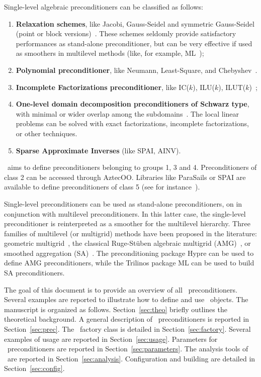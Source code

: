 Single-level algebraic preconditioners can be classified as follows:
\begin{enumerate}
\item {\bf Relaxation schemes},
  like Jacobi, Gauss-Seidel and symmetric Gauss-Seidel (point or block versions)~\cite{varga00matrix}.
  These schemes seldomly provide satisfactory performances as stand-alone
  preconditioner, but can be very effective if used as smoothers in
  multilevel methods (like, for example, ML~\cite{ml-guide});
\item {\bf Polynomial preconditioner}, like Neumann, Least-Square, and
Chebyshev~\cite{saad96iterative}.
\item {\bf Incomplete Factorizations preconditioner}, like IC($k$), ILU($k$), 
  ILUT($k$)~\cite{saad96iterative};
\item {\bf One-level domain decomposition preconditioners of Schwarz type},
  with minimal or wider overlap among the subdomains~\cite{smith96parallel,
    QV2}. The local linear problems
  can be solved with exact factorizations, incomplete factorizations, or
  other techniques.
\item {\bf Sparse Approximate Inverses} (like SPAI, AINV).
\end{enumerate}
\ifpack\ aims to define preconditioners belonging to groups 1, 3 and 4.
Preconditioners of class 2 can be accessed through AztecOO. Libraries like
ParaSails or SPAI are available to define preconditioners of class 5 
(see for instance~\cite{grote97parallel,benzi98sparse}).

\begin{remark}
Single-level preconditioners can be used as stand-alone preconditioners, on in
conjunction with multilevel preconditioners. In this latter case, the
single-level preconditioner is reinterpreted as a smoother for the multilevel
hierarchy. Three families of multilevel (or multigrid) methods have been
proposed in the literature: geometric multigrid~\cite{brandt.classic},
the classical Ruge-St\"uben algebraic multigrid (AMG)~\cite{ruge87algebraic}, 
  or smoothed aggregation (SA)~\cite{vanek4}.
The preconditioning package Hypre can be used to define AMG preconditioners,
  while the Trilinos package ML can be used to build SA preconditioners.
\end{remark}

\smallskip

The goal of this document is to provide an overview of all \ifpack\
  preconditioners. Several examples are reported to illustrate how to define
  and use \ifpack\ objects. The manuscript is organized as follows. Section~\ref{sec:theo} briefly outlines
the theoretical background. A general description of \ifpack\
  preconditioners is reported in Section~\ref{sec:prec}.
The \ifpack\ factory class is detailed in
Section~\ref{sec:factory}. Several examples of usage are reported in
Section~\ref{sec:usage}. Parameters for \ifpack~preconditioners are reported in
Section~\ref{sec:parameters}. The analysis tools of \ifpack\ are reported in
Section~\ref{sec:analysis}. Configuration and building are detailed in
Section~\ref{sec:config}.

